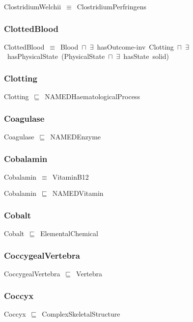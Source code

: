 \documentclass{article}
\begin{document}
ClostridiumWelchii~\ensuremath{\equiv}~ClostridiumPerfringens

\subsubsection*{ClottedBlood}

ClottedBlood~\ensuremath{\equiv}~Blood~\ensuremath{\sqcap}~\ensuremath{\exists}~hasOutcome-inv~Clotting~\ensuremath{\sqcap}~\ensuremath{\exists}~hasPhysicalState~(PhysicalState~\ensuremath{\sqcap}~\ensuremath{\exists}~hasState~solid)

\subsubsection*{Clotting}

Clotting~\ensuremath{\sqsubseteq}~NAMEDHaematologicalProcess~

\subsubsection*{Coagulase}

Coagulase~\ensuremath{\sqsubseteq}~NAMEDEnzyme~

\subsubsection*{Cobalamin}

Cobalamin~\ensuremath{\equiv}~VitaminB12

Cobalamin~\ensuremath{\sqsubseteq}~NAMEDVitamin~

\subsubsection*{Cobalt}

Cobalt~\ensuremath{\sqsubseteq}~ElementalChemical~

\subsubsection*{CoccygealVertebra}

CoccygealVertebra~\ensuremath{\sqsubseteq}~Vertebra~

\subsubsection*{Coccyx}

Coccyx~\ensuremath{\sqsubseteq}~ComplexSkeletalStructure~
\end{document}
